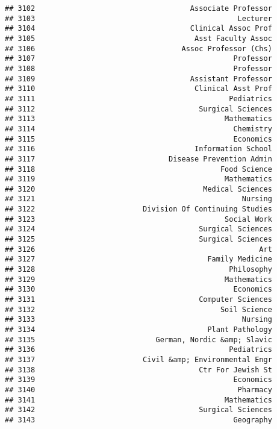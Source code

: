 \documentclass[
]{article}
\begin{document}
\begin{verbatim}
## 3102                                    Associate Professor
## 3103                                               Lecturer
## 3104                                    Clinical Assoc Prof
## 3105                                     Asst Faculty Assoc
## 3106                                  Assoc Professor (Chs)
## 3107                                              Professor
## 3108                                              Professor
## 3109                                    Assistant Professor
## 3110                                     Clinical Asst Prof
## 3111                                             Pediatrics
## 3112                                      Surgical Sciences
## 3113                                            Mathematics
## 3114                                              Chemistry
## 3115                                              Economics
## 3116                                     Information School
## 3117                               Disease Prevention Admin
## 3118                                           Food Science
## 3119                                            Mathematics
## 3120                                       Medical Sciences
## 3121                                                Nursing
## 3122                         Division Of Continuing Studies
## 3123                                            Social Work
## 3124                                      Surgical Sciences
## 3125                                      Surgical Sciences
## 3126                                                    Art
## 3127                                        Family Medicine
## 3128                                             Philosophy
## 3129                                            Mathematics
## 3130                                              Economics
## 3131                                      Computer Sciences
## 3132                                           Soil Science
## 3133                                                Nursing
## 3134                                        Plant Pathology
## 3135                            German, Nordic &amp; Slavic
## 3136                                             Pediatrics
## 3137                         Civil &amp; Environmental Engr
## 3138                                      Ctr For Jewish St
## 3139                                              Economics
## 3140                                               Pharmacy
## 3141                                            Mathematics
## 3142                                      Surgical Sciences
## 3143                                              Geography

\end{verbatim}
\end{document}
